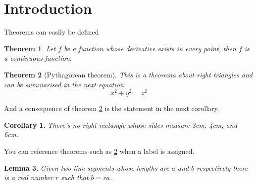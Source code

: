 \documentclass{article}
\newtheorem{theorem}{Theorem}[section]
\newtheorem{corollary}{Corollary}[theorem]
\newtheorem{lemma}[theorem]{Lemma}
\begin{document}
	\section{Introduction}
	Theorems can easily be defined
	
	\begin{theorem}
		Let $f$ be a function whose derivative exists in every point, then $f$ is 
		a continuous function.
	\end{theorem}
	
	\begin{theorem}[Pythagorean theorem]
		\label{pythagorean}
		This is a theorema about right triangles and can be summarised in the next 
		equation 
		\[ x^2 + y^2 = z^2 \]
	\end{theorem}
	
	And a consequence of theorem \ref{pythagorean} is the statement in the next 
	corollary.
	
	\begin{corollary}
		There's no right rectangle whose sides measure 3cm, 4cm, and 6cm.
	\end{corollary}
	
	You can reference theorems such as \ref{pythagorean} when a label is assigned.
	
	\begin{lemma}
		Given two line segments whose lengths are $a$ and $b$ respectively there is a 
		real number $r$ such that $b=ra$.
	\end{lemma}
\end{document}
